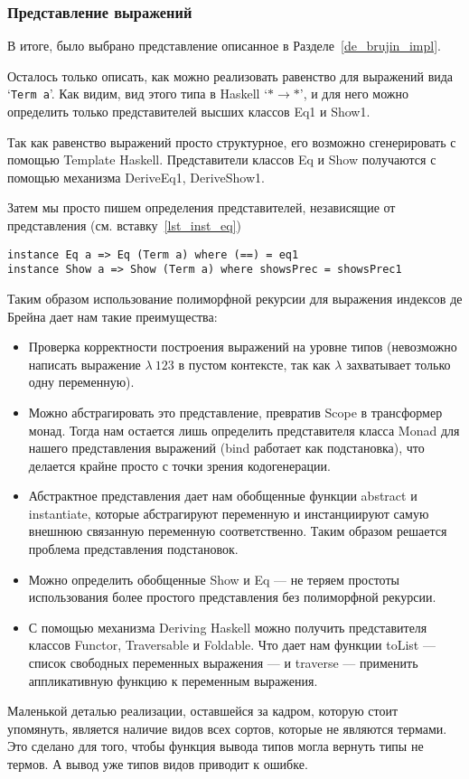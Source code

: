\pagebreak
\subsubsection{Представление выражений}\label{final_repr}

В итоге, было выбрано представление описанное в Разделе~\ref{de_brujin_impl}.

Осталось только описать, как можно реализовать равенство для выражений вида `\lstinline{Term a}'. Как видим, вид этого типа в Haskell `$* \rightarrow *$', и для него можно определить только представителей высших классов\cite{prel_extras} Eq1 и Show1.

Так как равенство выражений просто структурное, его возможно сгенерировать с помощью Template Haskell\cite{TH}. Представители классов Eq и Show получаются с помощью механизма DeriveEq1, DeriveShow1\cite{deriveCompat}.

Затем мы просто пишем определения представителей, независящие от представления (см. вставку~\ref{lst_inst_eq})

\begin{lstlisting}[caption={Определение представителей классов Eq и Show для представления АСД}, captionpos=b, frame=single, float,floatplacement=H, label = {lst_inst_eq}]
instance Eq a => Eq (Term a) where (==) = eq1
instance Show a => Show (Term a) where showsPrec = showsPrec1
\end{lstlisting}

Таким образом использование полиморфной рекурсии для выражения индексов де Брейна дает нам такие преимущества:
\begin{itemize}
  \item Проверка корректности построения выражений на уровне типов (невозможно написать выражение $\lambda\ 123$ в пустом контексте, так как $\lambda$ захватывает только одну переменную).
  \item Можно абстрагировать это представление, превратив Scope в трансформер монад. Тогда нам остается лишь определить представителя класса Monad для нашего представления выражений (bind работает как подстановка), что делается крайне просто с точки зрения кодогенерации.
  \item Абстрактное представления дает нам обобщенные функции abstract и instantiate, которые абстрагируют переменную и инстанциируют самую внешнюю связанную переменную соответственно. Таким образом решается проблема представления подстановок.
  \item Можно определить обобщенные Show и Eq --- не теряем простоты использования более простого представления без полиморфной рекурсии.
  \item С помощью механизма Deriving Haskell можно получить представителя классов Functor, Traversable и Foldable. Что дает нам функции toList --- список свободных переменных выражения --- и traverse --- применить аппликативную функцию к переменным выражения.

\end{itemize}

\hfill

Маленькой деталью реализации, оставшейся за кадром, которую стоит упомянуть, является наличие видов всех сортов, которые не являются термами. Это сделано для того, чтобы функция вывода типов могла вернуть типы не термов. А вывод уже типов видов приводит к ошибке.
